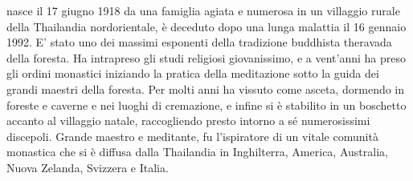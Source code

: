 
\clearpage
\thispagestyle{empty}

\vspace*{\beforechapskip}
\vspace*{\midchapskip}

\noindent
{\scshape \theauthor} nasce il 17 giugno 1918 da una famiglia agiata e numerosa in
un villaggio rurale della Thailandia nordorientale, è deceduto dopo una
lunga malattia il 16 gennaio 1992. E' stato uno dei massimi esponenti
della tradizione buddhista theravada della foresta. Ha intrapreso gli
studi religiosi giovanissimo, e a vent'anni ha preso gli ordini
monastici iniziando la pratica della meditazione sotto la guida dei
grandi maestri della foresta. Per molti anni ha vissuto come asceta,
dormendo in foreste e caverne e nei luoghi di cremazione, e infine si è
stabilito in un boschetto accanto al villaggio natale, raccogliendo
presto intorno a sé numerosissimi discepoli. Grande maestro e meditante,
fu l'ispiratore di un vitale comunità monastica che si è diffusa dalla
Thailandia in Inghilterra, America, Australia, Nuova Zelanda, Svizzera e
Italia.

